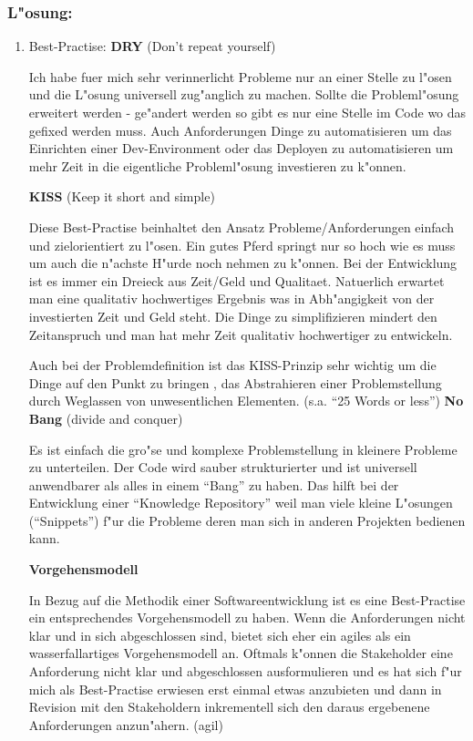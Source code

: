 \subsubsection*{L"osung:}
\begin{enumerate}
\item Best-Practise:
\smallbreak
\textbf{DRY} (Don't repeat yourself)

Ich habe fuer mich sehr verinnerlicht Probleme nur an einer Stelle zu l"osen und die L"osung universell zug"anglich zu machen. Sollte die Probleml"osung erweitert werden - ge"andert werden so gibt es nur eine Stelle im Code wo das gefixed werden muss.
Auch Anforderungen Dinge zu automatisieren um das Einrichten einer Dev-Environment oder das Deployen zu automatisieren um mehr Zeit in die eigentliche Probleml"osung investieren zu k"onnen.

\textbf{KISS} (Keep it short and simple)

Diese Best-Practise beinhaltet den Ansatz Probleme/Anforderungen einfach und zielorientiert zu l"osen. Ein gutes Pferd springt nur so hoch wie es muss um auch die n"achste H"urde noch nehmen zu k"onnen.
Bei der Entwicklung ist es immer ein Dreieck aus Zeit/Geld und Qualitaet. Natuerlich erwartet man eine qualitativ hochwertiges Ergebnis was in Abh"angigkeit von der investierten Zeit und Geld steht.
Die Dinge zu simplifizieren mindert den Zeitanspruch und man hat mehr Zeit qualitativ hochwertiger zu entwickeln.

Auch bei der Problemdefinition ist das KISS-Prinzip sehr wichtig um die Dinge auf den Punkt zu bringen , das Abstrahieren einer Problemstellung durch Weglassen von unwesentlichen Elementen. (s.a. ``25 Words or less'')
\newpage
\textbf{No Bang} (divide and conquer)

Es ist einfach die gro"se und komplexe Problemstellung in kleinere Probleme zu unterteilen. Der Code wird sauber strukturierter und ist universell anwendbarer als alles in einem ``Bang'' zu haben. Das hilft bei der Entwicklung einer ``Knowledge Repository'' weil man viele kleine L"osungen (``Snippets'') f"ur die Probleme deren man sich in anderen Projekten bedienen kann.

\textbf{Vorgehensmodell}

In Bezug auf die Methodik einer Softwareentwicklung ist es eine Best-Practise ein entsprechendes Vorgehensmodell zu haben. Wenn die Anforderungen nicht klar und in sich abgeschlossen sind, bietet sich eher ein agiles als ein wasserfallartiges Vorgehensmodell an.
Oftmals k"onnen die Stakeholder eine Anforderung nicht klar und abgeschlossen ausformulieren und es hat sich f"ur mich als Best-Practise erwiesen erst einmal etwas anzubieten und dann in Revision mit den Stakeholdern inkrementell sich den daraus ergebenene Anforderungen anzun"ahern. (agil)


\end{enumerate}

